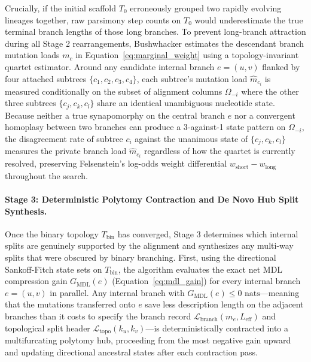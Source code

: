 \documentclass[11pt,a4paper]{article}
\begin{document}
Crucially, if the initial scaffold $T_0$ erroneously grouped two rapidly evolving lineages together, raw parsimony step counts on $T_0$ would underestimate the true terminal branch lengths of those long branches. To prevent long-branch attraction during all Stage 2 rearrangements, Bushwhacker estimates the descendant branch mutation loads $m_c$ in Equation~\eqref{eq:marginal_weight} using a topology-invariant quartet estimator. Around any candidate internal branch $e = (u,v)$ flanked by four attached subtrees $\{c_1, c_2, c_3, c_4\}$, each subtree's mutation load $\hat{m}_{c_i}$ is measured conditionally on the subset of alignment columns $\Omega_{-i}$ where the other three subtrees $\{c_j, c_k, c_l\}$ share an identical unambiguous nucleotide state. Because neither a true synapomorphy on the central branch $e$ nor a convergent homoplasy between two branches can produce a 3-against-1 state pattern on $\Omega_{-i}$, the disagreement rate of subtree $c_i$ against the unanimous state of $\{c_j, c_k, c_l\}$ measures the private branch load $\hat{m}_{c_i}$ regardless of how the quartet is currently resolved, preserving Felsenstein's log-odds weight differential $w_{\text{short}} - w_{\text{long}}$ throughout the search.

\paragraph{Stage 3: Deterministic Polytomy Contraction and De Novo Hub Split Synthesis.}
Once the binary topology $T_{\text{bin}}$ has converged, Stage 3 determines which internal splits are genuinely supported by the alignment and synthesizes any multi-way splits that were obscured by binary branching. First, using the directional Sankoff-Fitch state sets on $T_{\text{bin}}$, the algorithm evaluates the exact net MDL compression gain $G_{\text{MDL}}(e)$ (Equation~\eqref{eq:mdl_gain}) for every internal branch $e = (u,v)$ in parallel. Any internal branch with $G_{\text{MDL}}(e) \le 0\text{ nats}$---meaning that the mutations transferred onto $e$ save less description length on the adjacent branches than it costs to specify the branch record $\mathcal{L}_{\text{branch}}(m_e, L_{\text{eff}})$ and topological split header $\mathcal{L}_{\text{topo}}(k_u, k_v)$---is deterministically contracted into a multifurcating polytomy hub, proceeding from the most negative gain upward and updating directional ancestral states after each contraction pass.
\end{document}
